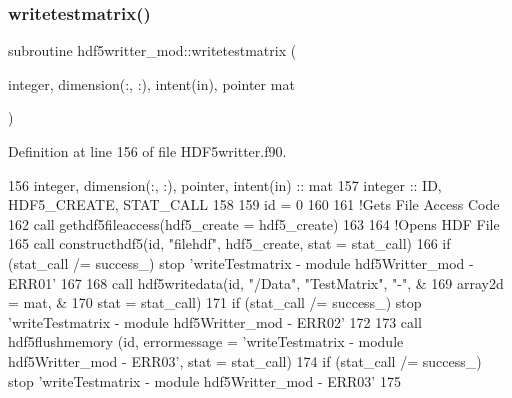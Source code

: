\mbox{\label{namespacehdf5writter__mod_adc4cbad9398ee6e9cb5723a30a7c44b1}} 
\subsubsection{\texorpdfstring{writetestmatrix()}{writetestmatrix()}}
{\footnotesize\ttfamily subroutine hdf5writter\+\_\+mod\+::writetestmatrix (\begin{DoxyParamCaption}\item[{integer, dimension(\+:, \+:), intent(in), pointer}]{mat }\end{DoxyParamCaption})\hspace{0.3cm}{\ttfamily [private]}}



Definition at line 156 of file H\+D\+F5writter.\+f90.


\begin{DoxyCode}
156     \textcolor{keywordtype}{integer}, \textcolor{keywordtype}{dimension(:, :)}, \textcolor{keywordtype}{pointer}, \textcolor{keywordtype}{intent(in)} :: mat
157     \textcolor{keywordtype}{integer} :: ID, HDF5\_CREATE, STAT\_CALL
158 
159     id = 0
160 
161     \textcolor{comment}{!Gets File Access Code}
162     \textcolor{keyword}{call }gethdf5fileaccess(hdf5\_create = hdf5\_create)
163 
164     \textcolor{comment}{!Opens HDF File}
165     \textcolor{keyword}{call }constructhdf5(id, \textcolor{stringliteral}{"filehdf"}, hdf5\_create, stat = stat\_call)
166     \textcolor{keywordflow}{if} (stat\_call /= success\_) stop \textcolor{stringliteral}{'writeTestmatrix - module hdf5Writter\_mod - ERR01'}
167 
168     \textcolor{keyword}{call }hdf5writedata(id, \textcolor{stringliteral}{"/Data"}, \textcolor{stringliteral}{"TestMatrix"}, \textcolor{stringliteral}{"-"},         &
169         array2d = mat,            &
170         stat = stat\_call)
171     \textcolor{keywordflow}{if} (stat\_call /= success\_) stop \textcolor{stringliteral}{'writeTestmatrix - module hdf5Writter\_mod - ERR02'}
172 
173     \textcolor{keyword}{call }hdf5flushmemory (id, errormessage = \textcolor{stringliteral}{'writeTestmatrix - module hdf5Writter\_mod - ERR03'}, stat = 
      stat\_call)
174     \textcolor{keywordflow}{if} (stat\_call /= success\_) stop \textcolor{stringliteral}{'writeTestmatrix - module hdf5Writter\_mod - ERR03'}
175 
\end{DoxyCode}
